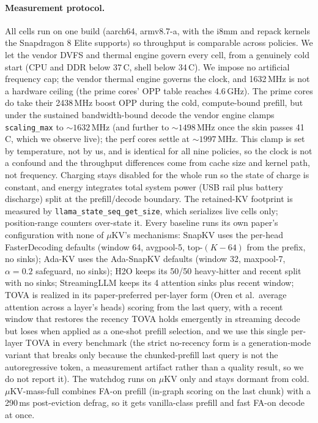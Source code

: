 \documentclass[sigconf, anonymous=false, screen=true]{acmart}
\newcommand{\ub}{\_\allowbreak}
\begin{document}
\paragraph{Measurement protocol.}\label{sec:revised-protocol}
All cells run on one build (aarch64, armv8.7-a, with the i8mm and repack kernels the Snapdragon 8 Elite supports) so throughput is comparable across policies. We let the vendor DVFS and thermal engine govern every cell, from a genuinely cold start (CPU and DDR below 37\,\textdegree C, shell below 34\,\textdegree C). We impose no artificial frequency cap; the vendor thermal engine governs the clock, and 1632\,MHz is not a hardware ceiling (the prime cores' OPP table reaches 4.6\,GHz). The prime cores do take their 2438\,MHz boost OPP during the cold, compute-bound prefill, but under the sustained bandwidth-bound decode the vendor engine clamps \texttt{scaling\ub max} to ${\sim}1632$\,MHz (and further to ${\sim}1498$\,MHz once the skin passes 41\,\textdegree C, which we observe live); the perf cores settle at ${\sim}1997$\,MHz. This clamp is set by temperature, not by us, and is identical for all nine policies, so the clock is not a confound and the throughput differences come from cache size and kernel path, not frequency. Charging stays disabled for the whole run so the state of charge is constant, and energy integrates total system power (USB rail plus battery discharge) split at the prefill/decode boundary. The retained-KV footprint is measured by \texttt{llama\ub state\ub seq\ub get\ub size}, which serializes live cells only; position-range counters over-state it. Every baseline runs its own paper's configuration with none of $\mu$KV's mechanisms: SnapKV uses the per-head FasterDecoding defaults (window 64, avgpool-5, top-$(K{-}64)$ from the prefix, no sinks); Ada-KV uses the Ada-SnapKV defaults (window 32, maxpool-7, $\alpha{=}0.2$ safeguard, no sinks); H2O keeps its 50/50 heavy-hitter and recent split with no sinks; StreamingLLM keeps its 4 attention sinks plus recent window; TOVA is realized in its paper-preferred per-layer form (Oren et al.\ average attention across a layer's heads) scoring from the last query, with a recent window that restores the recency TOVA holds emergently in streaming decode but loses when applied as a one-shot prefill selection, and we use this single per-layer TOVA in every benchmark (the strict no-recency form is a generation-mode variant that breaks only because the chunked-prefill last query is not the autoregressive token, a measurement artifact rather than a quality result, so we do not report it). The watchdog runs on $\mu$KV only and stays dormant from cold. $\mu$KV-mass-full combines FA-on prefill (in-graph scoring on the last chunk) with a 290\,ms post-eviction defrag, so it gets vanilla-class prefill and fast FA-on decode at once.
\end{document}
